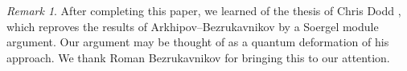 \documentclass[11pt,reqno]{amsart}
\newcommand{\cgk}{\widehat{\check{\mathfrak{g}}}_{\check{\kappa}}}
\newcommand{\aff}{\operatorname{aff}}
\newcommand{\fg}{\mathfrak{g}}
\theoremstyle{remark}
\newtheorem{re}[subsubsection]{Remark}
\numberwithin{equation}{section}
\newcommand{\cG}{\check{G}}
\renewcommand{\mod}{\text{\textendash}\mathsf{mod}}
\newcommand{\Whit}{\mathsf{Whit}}
\begin{document}
\begin{re} After completing this paper, we learned of the thesis of Chris Dodd 
\cite{dodd}, which reproves the results of Arkhipov--Bezrukavnikov \cite{ab} by 
a Soergel 
module argument. Our 
argument may be thought of as a quantum deformation of his approach. We thank 
Roman 
Bezrukavnikov for bringing this to our attention. 
\end{re}

%
%


\end{document}

